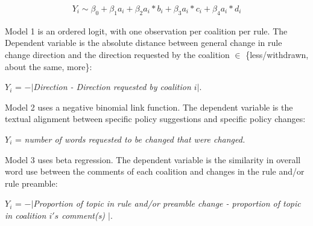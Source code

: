 \begin{align}
Y_i \sim \beta_0  + 
\beta_1a_i + \beta_2a_i*b_i + \beta_3a_i*c_i + \beta_4a_i*d_i
\end{align}

Model 1 is an ordered logit, with one observation per coalition per rule. 
The Dependent variable is the absolute distance between general change in rule change direction and the direction requested by the coalition $\in$ \{less/withdrawn, about the same, more\}: 

$Y_i$ =
\textit{$-|$Direction - Direction requested by coalition $ i |$}.

Model 2 uses a negative binomial link function.
The dependent variable is the textual alignment between specific policy suggestions and specific policy changes: 

$Y_i$ = \textit{number of words requested to be changed that were changed.}

Model 3 uses beta regression. The dependent variable is the similarity in overall word use between the comments of each coalition and changes in the rule and/or rule preamble:

$Y_i$ = \textit{$-|$Proportion of topic in rule and/or preamble change - proportion of topic in coalition $i's$ comment(s) $|$}.




